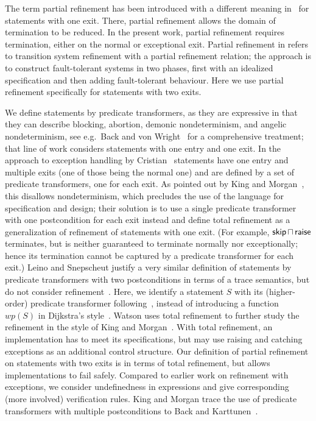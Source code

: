 \documentclass[submission,copyright,creativecommons]{eptcs}
\newcommand{\KW}[1]{\mathop{\sf #1}}
\newcommand{\SKIP}{\KW{skip}}
\newcommand{\RAISE}{\KW{raise}}
\newcommand{\meet}{\sqcap}
\begin{document}
The term partial refinement has been introduced with a different meaning in~\cite{Back81CorrectRefinement} for statements with one exit. There, partial refinement allows the domain of termination to be reduced. In the present work, partial refinement requires termination, either on the normal or exceptional exit. Partial refinement in \cite{JeffordsHeitmeyerArcherLeonard09CorrectFaultTolerantSystems} refers to transition system refinement with a partial refinement relation; the approach is to construct fault-tolerant systems in two phases, first with an idealized specification and then adding fault-tolerant behaviour. Here we use partial refinement specifically for statements with two exits.

We define statements by predicate transformers, as they are expressive in that they can describe blocking, abortion, demonic nondeterminism, and angelic nondeterminism, see e.g.~Back and von Wright~\cite{BackVonWright98RefinementCalculus} for a comprehensive treatment; that line of work considers statements with one entry and one exit. In the approach to exception handling by Cristian~\cite{Cristian84CorrectRobustPrograms} statements have one entry and multiple exits (one of those being the normal one) and are defined by a set of predicate transformers, one for each exit. As pointed out by King and Morgan~\cite{KingMorgan95ExitsInRefinementCalculus}, this disallows nondeterminism, which precludes the use of the language for specification and design; their solution is to use a single predicate transformer with one postcondition for each exit instead and define total refinement as a generalization of refinement of statements with one exit. (For example, $\SKIP \meet \RAISE$ terminates, but is neither guaranteed to terminate normally nor exceptionally; hence its termination cannot be captured by a predicate transformer for each exit.) Leino and Snepscheut justify a very similar definition of statements by predicate transformers with two postconditions in terms of a trace semantics, but do not consider refinement~\cite{LeinoSnepscheut94SemanticsExceptions}. Here, we identify a statement $S$ with its (higher-order) predicate transformer following~\cite{BackVonWright98RefinementCalculus}, instead of introducing a function $wp(S)$ in Dijkstra's style~\cite{Dijkstra75GuardedCommands}. Watson uses total refinement to further study the refinement in the style of King and Morgan~\cite{Watson02RefiningExceptions}. With total refinement, an implementation has to meet its specifications, but may use raising and catching exceptions as an additional control structure. Our definition of partial refinement on statements with two exits is in terms of total refinement, but allows implementations to fail safely. Compared to earlier work on refinement with exceptions, we consider undefinedness in expressions and give corresponding (more involved) verification rules. King and Morgan trace the use of predicate transformers with multiple postconditions to Back and Karttunen~\cite{BackKarttunen83PredicateTransformerMultipleExits}. 
\end{document}
